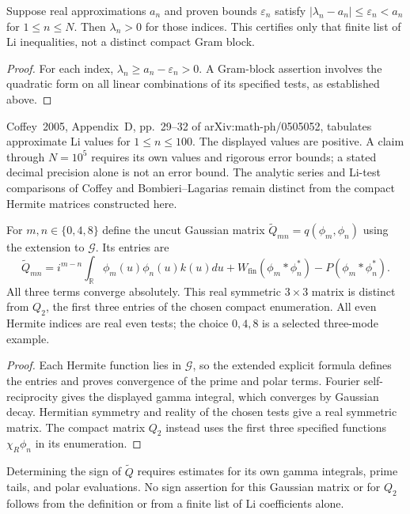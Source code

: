 \begin{proposition}
\label{v4-arith:w7-h:thm:coffey}
Suppose real approximations $a_n$ and proven bounds $\varepsilon_n$
satisfy $|\lambda_n-a_n|\le\varepsilon_n<a_n$ for $1\le n\le N$.
Then $\lambda_n>0$ for those indices. This certifies only that
finite list of Li inequalities, not a distinct compact Gram block.
\end{proposition}
\begin{proof}
For each index, $\lambda_n\ge a_n-\varepsilon_n>0$.
A Gram-block assertion involves the quadratic form on all linear
combinations of its specified tests, as established above.
\end{proof}
Coffey~2005, Appendix~D, pp.~29--32 of arXiv:math-ph/0505052,
tabulates approximate Li values for $1\le n\le100$.
The displayed values are positive. A claim through $N=10^5$ requires
its own values and rigorous error bounds; a stated decimal precision
alone is not an error bound. The analytic series and Li-test
comparisons of Coffey and Bombieri--Lagarias remain distinct from
the compact Hermite matrices constructed here.

\begin{proposition}
\label{v4-arith:w7-h:prop:small-N}
For $m,n\in\{0,4,8\}$ define the uncut Gaussian matrix
$\widetilde Q_{mn}=q(\phi_m,\phi_n)$ using the extension to
$\mathscr G$. Its entries are
\[
 \widetilde Q_{mn}
 =i^{m-n}\int_{\mathbb R}\phi_m(u)\phi_n(u)k(u)du
 +W_{\mathrm{fin}}(\phi_m*\phi_n^*)-P(\phi_m*\phi_n^*).
\]
All three terms converge absolutely. This real symmetric
$3\times3$ matrix is distinct from $Q_2$, the first three entries
of the chosen compact enumeration. All even Hermite indices are
real even tests; the choice $0,4,8$ is a selected three-mode example.
\end{proposition}
\begin{proof}
Each Hermite function lies in $\mathscr G$, so the extended explicit
formula defines the entries and proves convergence of the prime and
polar terms. Fourier self-reciprocity gives the displayed gamma integral,
which converges by Gaussian decay. Hermitian symmetry and reality of
the chosen tests give a real symmetric matrix.
The compact matrix $Q_2$ instead uses the first three specified
functions $\chi_R\phi_n$ in its enumeration.
\end{proof}

Determining the sign of $\widetilde Q$ requires estimates for its
own gamma integrals, prime tails, and polar evaluations.
No sign assertion for this Gaussian matrix or for $Q_2$ follows
from the definition or from a finite list of Li coefficients alone.

